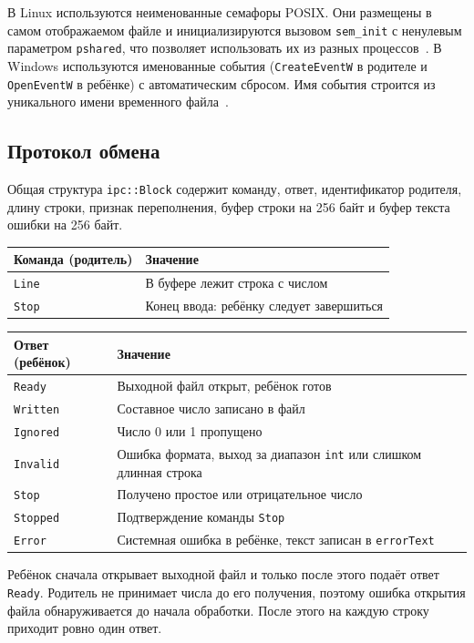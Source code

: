 В Linux используются неименованные семафоры POSIX. Они размещены в самом отображаемом файле и инициализируются вызовом \texttt{sem\_init} с ненулевым параметром \texttt{pshared}, что позволяет использовать их из разных процессов~\cite{linuxsem,linuxsemoverview}. В Windows используются именованные события (\texttt{CreateEventW} в родителе и \texttt{OpenEventW} в ребёнке) с автоматическим сбросом. Имя события строится из уникального имени временного файла~\cite{winevent}.

\subsection{Протокол обмена}
Общая структура \texttt{ipc::Block} содержит команду, ответ, идентификатор родителя, длину строки, признак переполнения, буфер строки на 256 байт и буфер текста ошибки на 256 байт.

\begin{center}
\begin{tabular}{ll}
Команда (родитель) & Значение \\
\hline
\texttt{Line} & В буфере лежит строка с числом \\
\texttt{Stop} & Конец ввода: ребёнку следует завершиться \\
\end{tabular}
\end{center}

\begin{center}
\begin{tabular}{ll}
Ответ (ребёнок) & Значение \\
\hline
\texttt{Ready} & Выходной файл открыт, ребёнок готов \\
\texttt{Written} & Составное число записано в файл \\
\texttt{Ignored} & Число 0 или 1 пропущено \\
\texttt{Invalid} & Ошибка формата, выход за диапазон \texttt{int} или слишком длинная строка \\
\texttt{Stop} & Получено простое или отрицательное число \\
\texttt{Stopped} & Подтверждение команды \texttt{Stop} \\
\texttt{Error} & Системная ошибка в ребёнке, текст записан в \texttt{errorText} \\
\end{tabular}
\end{center}

Ребёнок сначала открывает выходной файл и только после этого подаёт ответ \texttt{Ready}. Родитель не принимает числа до его получения, поэтому ошибка открытия файла обнаруживается до начала обработки. После этого на каждую строку приходит ровно один ответ.

